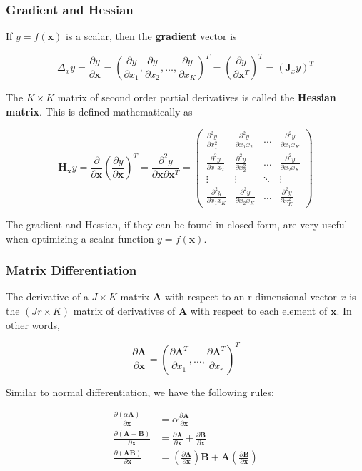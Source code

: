 \documentclass{beamer}
\begin{document}
\begin{frame}
\frametitle{Gradient and Hessian}
If $y = f(\mathbf{x})$ is a scalar, then the \textbf{gradient} vector is

$$\Delta_xy = \frac{\partial y}{\partial \mathbf{x}} = \left(\frac{\partial y}{\partial x_1}, \frac{\partial y}{\partial x_2}, \hdots, \frac{\partial y}{\partial x_K} \right)^T = \left(\frac{\partial y}{\partial \mathbf{x}^T}\right)^T = (\mathbf{J}_xy)^T$$

The $K \times K$ matrix of second order partial derivatives is called the \textbf{Hessian matrix}.  This is defined mathematically as

$$\mathbf{H}_{\mathbf{x}}y = \frac{\partial }{\partial \mathbf{x}} \left(\frac{\partial y}{\partial \mathbf{x}}\right)^T = \frac{\partial ^2y}{\partial \mathbf{x} \partial \mathbf{x}^T} = 
\begin{pmatrix}
    \frac{\partial ^2 y}{\partial x^2_1} & \frac{\partial ^2y}{\partial x_1 x_2} & \dots  & \frac{\partial ^2y}{\partial x_1 x_K} \\
    \frac{\partial ^2 y}{\partial x_1x_2} & \frac{\partial ^2y}{\partial x^2_2} & \dots  & \frac{\partial ^2y}{\partial x_2 x_K}\\
    \vdots & \vdots  & \ddots & \vdots \\
    \frac{\partial ^2y}{\partial x_1 x_K} & \frac{\partial ^2y}{\partial x_2 x_K} & \dots  & \frac{\partial ^2y}{\partial x^2_K}
\end{pmatrix}
$$

The gradient and Hessian, if they can be found in closed form, are very useful when optimizing a scalar function $y = f(\mathbf{x})$. 
\end{frame}

\begin{frame}
\frametitle{Matrix Differentiation}
The derivative of a $J \times K$ matrix $\mathbf{A}$ with respect to an r dimensional vector $x$ is the $(Jr \times K)$ matrix of derivatives of $\mathbf{A}$ with respect to each element of $\mathbf{x}$.  In other words,

\[\frac{\partial \mathbf{A}}{\partial \mathbf{x}} = \left(\frac{\partial \mathbf{A}^T}{\partial x_1}, \hdots, \frac{\partial \mathbf{A}^T}{\partial x_r}  \right)^T\]

Similar to normal differentiation, we have the following rules:

\begin{align*}
\frac{\partial (\alpha \mathbf{A})}{\partial \mathbf{x}} &= \alpha \frac{\partial \mathbf{A}}{\partial \mathbf{x}}\\
\frac{\partial (\mathbf{A+B})}{\partial \mathbf{x}} &=  \frac{\partial \mathbf{A}}{\partial \mathbf{x}} + \frac{\partial \mathbf{B}}{\partial \mathbf{x}}\\
\frac{\partial (\mathbf{AB})}{\partial \mathbf{x}} &=  \left(\frac{\partial \mathbf{A}}{\partial \mathbf{x}}\right)\mathbf{B} + \mathbf{A}\left(\frac{\partial \mathbf{B}}{\partial \mathbf{x}}\right)\\
\end{align*}
\end{frame}
\end{document}
